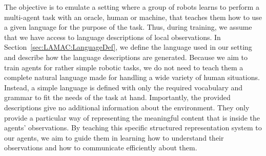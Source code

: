 The objective is to emulate a setting where a group of robots learns to perform a multi-agent task with an oracle, human or machine, that teaches them how to use a given language for the purpose of the task. Thus, during training, we assume that we have access to language descriptions of local observations. In Section~\ref{sec:LAMAC:LanguageDef}, we define the language used in our setting and describe how the language descriptions are generated. Because we aim to train agents for rather simple robotic tasks, we do not need to teach them a complete natural language made for handling a wide variety of human situations. Instead, a simple language is defined with only the required vocabulary and grammar to fit the needs of the task at hand. Importantly, the provided descriptions give no additional information about the environment. They only provide a particular way of representing the meaningful content that is inside the agents' observations. By teaching this specific structured representation system to our agents, we aim to guide them in learning how to understand their observations and how to communicate efficiently about them.





